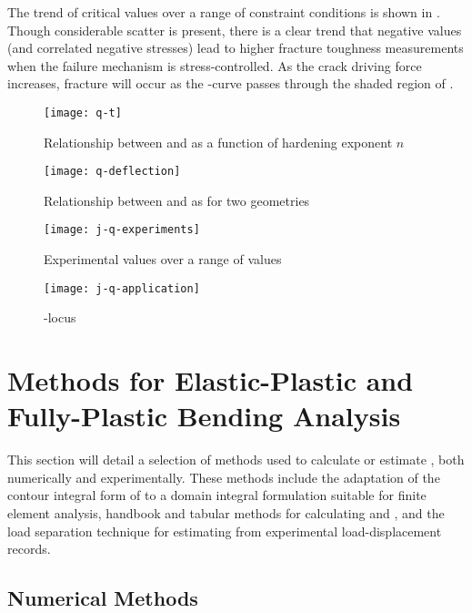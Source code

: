 The trend of critical \J values over a range of constraint conditions is shown in .
Though considerable scatter is present, there is a clear trend that negative \Q values (and correlated negative \T stresses) lead to higher fracture toughness measurements when the failure mechanism is stress-controlled.
As the crack driving force increases, fracture will occur as the \J-\Q curve passes through the shaded region of .
\begin{figure}
\centering
\texttt{[image: q-t]}
\caption[Relationship between \Q and \T as a function of hardening exponent \(n\)]{\label{fig:q-vs-t} Relationship between \Q and \T as a function of hardening exponent \(n\) \citep{anderson2005}}
\end{figure}
\begin{figure}
\centering
\texttt{[image: q-deflection]}
\caption[Relationship between \Q and \J as for two geometries]{\label{fig:q-vs-J} Relationship between \Q and \J as for two geometries \citep{anderson2005}}
\end{figure}
\begin{figure}
\centering
\texttt{[image: j-q-experiments]}
\caption[Experimental \J values over a range of \Q values]{\label{fig:j-q-experiments} Experimental \J values over a range of \Q values \citep{anderson2005}}
\end{figure}
\begin{figure}
\centering
\texttt{[image: j-q-application]}
\caption[\J-\Q locus]{\label{fig:j-q-application} \J-\Q locus \citep{anderson2005}}
\end{figure}

\FloatBarrier
\section{Methods for Elastic-Plastic and Fully-Plastic Bending Analysis}

This section will detail a selection of methods used to calculate or estimate \J, both numerically and experimentally.
These methods include the adaptation of the contour integral form of \J to a domain integral formulation suitable for finite element analysis, handbook and tabular methods for calculating \J and \K, and the load separation technique for estimating \J from experimental load-displacement records.

\subsection{Numerical Methods}

